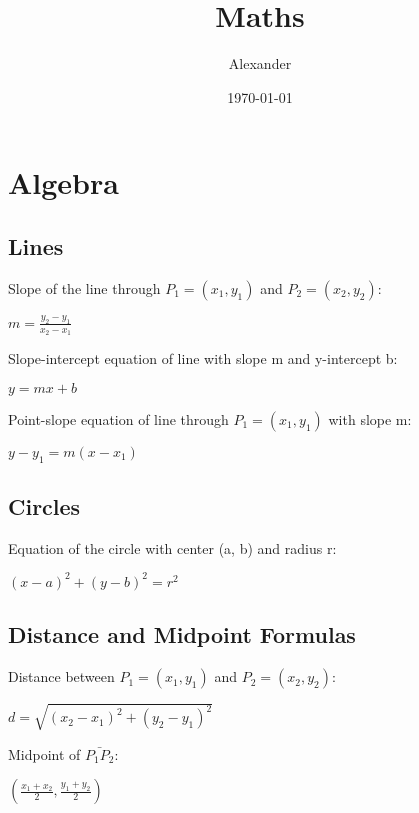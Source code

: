 \documentclass{article}
\title{Maths}
\author{Alexander}
\date{\today}
\begin{document}
\maketitle

\section* {Algebra}
	\subsection*{Lines}
		Slope of the line through $P_1 = (x_1, y_1)$ and $P_2 = (x_2, y_2)$:
			\begin{center}
			$m = \frac{y_2 - y_1}{x_2 - x_1}$
			\end{center}
		Slope-intercept equation of line with slope m and y-intercept b:
			\begin{center}
			$y = mx + b$
			\end{center}
		Point-slope equation of line through $P_1 = (x_1, y_1)$ with slope m:
			\begin{center}
			$y - y_1 = m(x - x_1)$
			\end{center}
	\subsection*{Circles}
		Equation of the circle with center (a, b) and radius r:
			\begin{center}
			$(x - a)^2 + (y - b)^2 = r^2$
			\end{center}
	\subsection*{Distance and Midpoint Formulas}
		Distance between $P_1 = (x_1, y_1)$ and $P_2 = (x_2, y_2)$:
			\begin{center}
			$d = \sqrt{(x_2 - x_1)^2 + (y_2 - y_1)^2}$
			\end{center}
		Midpoint of $\bar{P_1P_2}$:
			\begin{center}
			$(\frac{x_1 + x_2}{2}, \frac{y_1 + y_2}{2})$
			\end{center}
\end{document}
